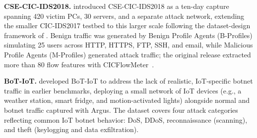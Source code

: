 \documentclass[sigconf]{acmart}
\begin{document}
\textbf{CSE-CIC-IDS2018.} \cite{sharafaldin2018toward} introduced CSE-CIC-IDS2018 as a ten-day capture spanning 420 victim PCs, 30 servers, and a separate attack network, extending the smaller CIC-IDS2017 testbed to this larger scale following the dataset-design framework of \cite{gharib2016evaluation}. Benign traffic was generated by Benign Profile Agents (B-Profiles) simulating 25 users across HTTP, HTTPS, FTP, SSH, and email, while Malicious Profile Agents (M-Profiles) generated attack traffic; the original release extracted more than 80 flow features with CICFlowMeter~\citep{lashkari2017characterization}.

\begin{table}[t]
\centering
\small
\caption{Attack Profiles in CSE-CIC-IDS2018 \citep{sharafaldin2018toward}.}
\label{tab:attack_profiles}
\end{table}

\textbf{BoT-IoT.} \citep{koroniotis_botiot_2019} developed BoT-IoT to address the lack of realistic, IoT-specific botnet traffic in earlier benchmarks, deploying a small network of IoT devices (e.g., a weather station, smart fridge, and motion-activated lights) alongside normal and botnet traffic captured with Argus. The dataset covers four attack categories reflecting common IoT botnet behavior: DoS, DDoS, reconnaissance (scanning), and theft (keylogging and data exfiltration).
\end{document}

